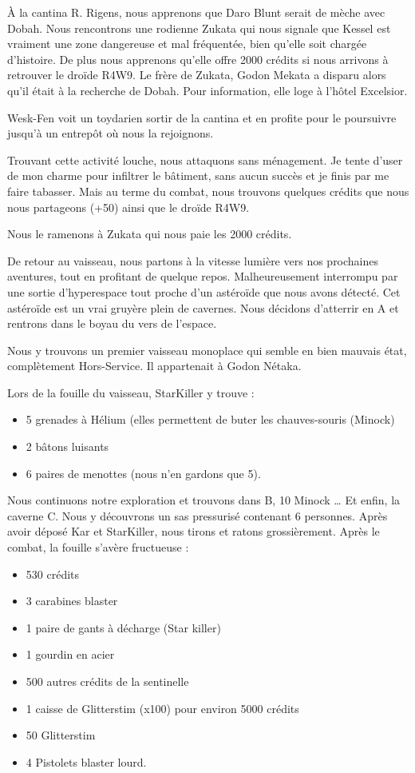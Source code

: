\documentclass[a4paper,9pt,twoside,twocolumn,openany]{book}
\begin{document}
À la cantina R. Rigens, nous apprenons que Daro Blunt serait de mèche avec Dobah. Nous rencontrons une rodienne Zukata qui nous signale que Kessel est vraiment une zone dangereuse et mal fréquentée, bien qu'elle soit chargée d'histoire. De plus nous apprenons qu'elle offre 2000 crédits si nous arrivons à retrouver le droïde R4W9. Le frère de Zukata, Godon Mekata a disparu alors qu'il était à la recherche de Dobah. Pour information, elle loge à l'hôtel Excelsior.

Wesk-Fen voit un toydarien sortir de la cantina et en profite pour le poursuivre jusqu’à un entrepôt où nous la rejoignons.

Trouvant cette activité louche, nous attaquons sans ménagement. Je tente d’user de mon charme pour infiltrer le bâtiment, sans aucun succès et je finis par me faire tabasser. Mais au terme du combat, nous trouvons quelques crédits que nous nous partageons (+50) ainsi que le droïde R4W9. 

Nous le ramenons à Zukata qui nous paie les 2000 crédits.

De retour au vaisseau, nous partons à la vitesse lumière vers nos prochaines aventures, tout en profitant de quelque repos. Malheureusement interrompu par une sortie d'hyperespace tout proche d’un astéroïde que nous avons détecté. Cet astéroïde est un vrai gruyère plein de cavernes. Nous décidons d’atterrir en A et rentrons dans le boyau du vers de l'espace.

Nous y trouvons un premier vaisseau monoplace qui semble en bien mauvais état, complètement Hors-Service. Il appartenait à Godon Nétaka.

Lors de la fouille du vaisseau, StarKiller y trouve :
\begin{itemize}
\item 5 grenades à Hélium (elles permettent de buter les chauves-souris (Minock)
\item 2 bâtons luisants
\item 6 paires de menottes (nous n’en gardons que 5).
\end{itemize}

Nous continuons notre exploration et trouvons dans B, 10 Minock … Et enfin, la caverne C. Nous y découvrons un sas pressurisé contenant 6 personnes. Après avoir déposé Kar et StarKiller, nous tirons et ratons grossièrement. Après le combat, la fouille s'avère fructueuse :
\begin{itemize}
\item 530 crédits
\item 3 carabines blaster
\item 1 paire de gants à décharge (Star killer)
\item 1 gourdin en acier
\item 500 autres crédits de la sentinelle
\item 1 caisse de Glitterstim (x100) pour environ 5000 crédits
\item 50 Glitterstim
\item 4 Pistolets blaster lourd.
\end{itemize}
\end{document}
